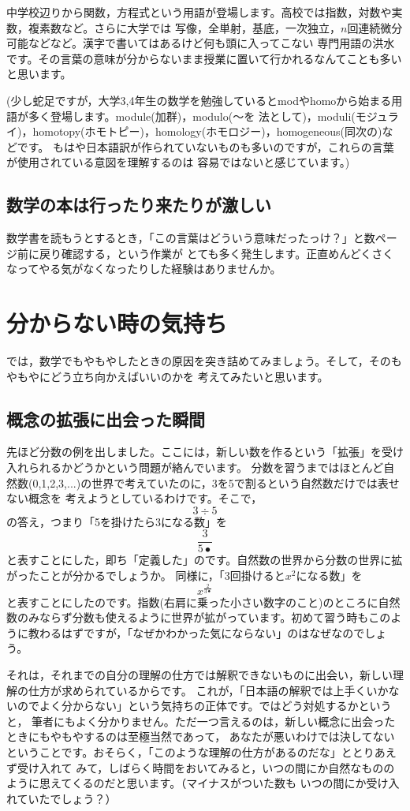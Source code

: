 \documentclass[./main]{subfiles}
\begin{document}
中学校辺りから関数，方程式という用語が登場します。高校では指数，対数や実数，複素数など。さらに大学では
写像，全単射，基底，一次独立，$n$回連続微分可能などなど。漢字で書いてはあるけど何も頭に入ってこない
専門用語の洪水です。その言葉の意味が分からないまま授業に置いて行かれるなんてことも多いと思います。

(少し蛇足ですが，大学3,4年生の数学を勉強しているとmodやhomoから始まる用語が多く登場します。module(加群)，modulo(～を
法として)，moduli(モジュライ)，homotopy(ホモトピー)，homology(ホモロジー)，homogeneous(同次の)などです。
もはや日本語訳が作られていないものも多いのですが，これらの言葉が使用されている意図を理解するのは
容易ではないと感じています。)


\subsection{数学の本は行ったり来たりが激しい}

数学書を読もうとするとき，「この言葉はどういう意味だったっけ？」と数ページ前に戻り確認する，という作業が
とても多く発生します。正直めんどくさくなってやる気がなくなったりした経験はありませんか。

\section{分からない時の気持ち}

では，数学でもやもやしたときの原因を突き詰めてみましょう。そして，そのもやもやにどう立ち向かえばいいのかを
考えてみたいと思います。

\subsection{概念の拡張に出会った瞬間}
先ほど分数の例を出しました。ここには，新しい数を作るという「拡張」を受け入れられるかどうかという問題が絡んでいます。
分数を習うまではほとんど自然数(0,1,2,3,...)の世界で考えていたのに，3を5で割るという自然数だけでは表せない概念を
考えようとしているわけです。そこで，
\[
3 \div 5
\]
の答え，つまり「5を掛けたら3になる数」を
\[
\frac{3}{5•}
\]
と表すことにした，即ち「定義した」のです。自然数の世界から分数の世界に拡がったことが分かるでしょうか。
同様に，「3回掛けると$x^2$になる数」を
\[
x^{\frac{2}{3•}}
\]
と表すことにしたのです。指数(右肩に乗った小さい数字のこと)のところに自然数のみならず分数も使えるように世界が拡がっています。初めて習う時もこのように教わるはずですが，「なぜかわかった気にならない」のはなぜなのでしょう。

それは，それまでの自分の理解の仕方では解釈できないものに出会い，新しい理解の仕方が求められているからです。
これが，「日本語の解釈では上手くいかないのでよく分からない」という気持ちの正体です。ではどう対処するかというと，
筆者にもよく分かりません。ただ一つ言えるのは，新しい概念に出会ったときにもやもやするのは至極当然であって，
あなたが悪いわけでは決してないということです。おそらく，「このような理解の仕方があるのだな」ととりあえず受け入れて
みて，しばらく時間をおいてみると，いつの間にか自然なもののように思えてくるのだと思います。（マイナスがついた数も
いつの間にか受け入れていたでしょう？）
\end{document}
